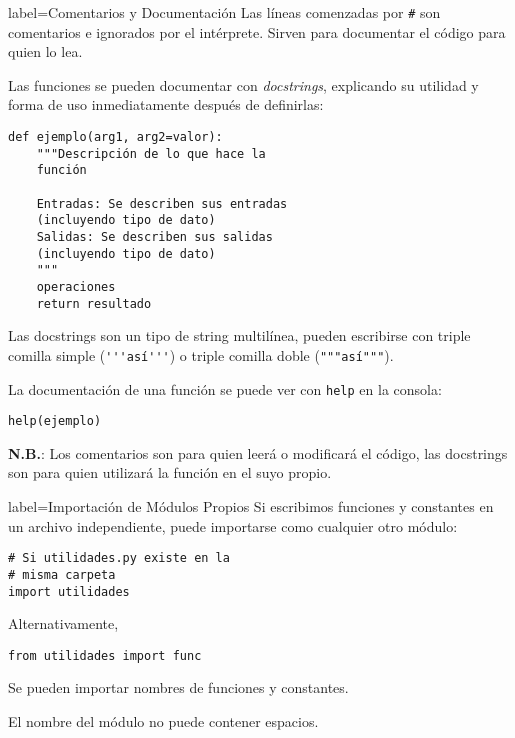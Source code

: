 \begin{contentbox}{label=Comentarios y Documentación}
    Las líneas comenzadas por \lstinline!#! son comentarios e ignorados por el intérprete. Sirven para documentar el código para quien lo lea.
    
    Las funciones se pueden documentar con \textit{docstrings}, explicando su utilidad y forma de uso inmediatamente después de definirlas:
\begin{lstlisting}
def ejemplo(arg1, arg2=valor):
    """Descripción de lo que hace la
    función
    
    Entradas: Se describen sus entradas 
    (incluyendo tipo de dato)
    Salidas: Se describen sus salidas 
    (incluyendo tipo de dato)
    """
    operaciones
    return resultado
\end{lstlisting}

    Las docstrings son un tipo de string multilínea, pueden escribirse con triple comilla simple (\lstinline!'''así'''!) o triple comilla doble (\lstinline!"""así"""!).

    La documentación de una función se puede ver con \lstinline!help! en la consola:
\begin{lstlisting}
help(ejemplo)
\end{lstlisting}
    
    \textbf{N.B.}: Los comentarios son para quien leerá o modificará el código, las docstrings son para quien utilizará la función en el suyo propio.
\end{contentbox}

\begin{contentbox}{label=Importación de Módulos Propios}
    Si escribimos funciones y constantes en un archivo independiente, puede importarse como cualquier otro módulo:
\begin{lstlisting}
# Si utilidades.py existe en la
# misma carpeta
import utilidades
\end{lstlisting}

Alternativamente,
\begin{lstlisting}
from utilidades import func
\end{lstlisting}
    
    Se pueden importar nombres de funciones y constantes.
    
    El nombre del módulo no puede contener espacios.
\end{contentbox}
